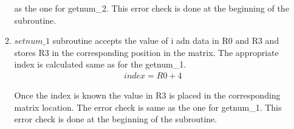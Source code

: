 \documentclass[a4paper,12pt]{article}
\begin{document}
\begin{enumerate}
\begin{flushleft}
\begin{enumerate}
\begin{flushleft}
\begin{flushleft}
     as the one for getnum\_2.
     This error check is done at the beginning of the subroutine. 
    \end{flushleft}
  \end{flushleft}
   \item 
   \begin{flushleft}
    $setnum\_1$ subroutine accepts the value of i adn data in R0 and R3 and stores R3 in the corresponding position in the 
    matrix. The appropriate index is calculated same as for the getnum\_1. 
    \begin{align}
     index = R0+4 \nonumber
    \end{align}
    \begin{flushleft}
    Once the index is known the value in R3 is placed in the corresponding matrix location. The error check is same
    as the one for getnum\_1.
    This error check is done at the beginning of the subroutine. 
    \end{flushleft}
   \end{flushleft}
  
 \end{enumerate}
  \end{flushleft}
  

\end{enumerate}
\end{document}
